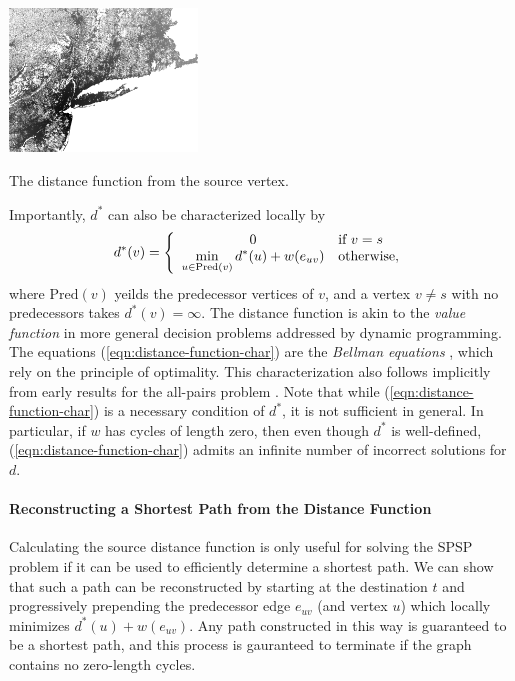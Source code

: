 \begin{marginfigure}%
   \centering%
   \includegraphics[width=5cm]{figs/incbi-road-ne/singleshot/example-dijkstraall.png}%
   \caption{The distance function from the source vertex.}%
   \label{fig:ibid:example-distance-all}%
\end{marginfigure}

Importantly, $d^*$ can also be characterized locally by
\begin{equation}
   d^*(v) = 
   \left\{ \begin{array}{cl}
      0 & \mbox{if } v = s \\
      \displaystyle\min_{u \in \mbox{\scriptsize Pred}(v)} d^*(u) + w(e_{uv}) & \mbox{otherwise,} \\
   \end{array} \right.
   \label{eqn:distance-function-char}
\end{equation}
where $\mbox{Pred}(v)$ yeilds the predecessor vertices of $v$,
and a vertex $v \neq s$ with no predecessors takes $d^*(v) = \infty$.
The distance function is akin to the \emph{value function}
in more general decision problems addressed by dynamic programming.
The equations (\ref{eqn:distance-function-char})
are the \emph{Bellman equations} \citep{bellman1958routing},
which rely on the principle of optimality.
This characterization also follows implicitly from early results for
the all-pairs problem
\citep{shimbel1955communicationnets, beckmann1955transportation}.
Note that while (\ref{eqn:distance-function-char})
is a necessary condition of $d^*$,
it is not sufficient in general.
In particular,
if $w$ has cycles of length zero,
then even though $d^*$ is well-defined,
(\ref{eqn:distance-function-char}) admits an infinite number
of incorrect solutions for $d$.

\paragraph{Reconstructing a Shortest Path from the Distance Function}
Calculating the source distance function is only useful for solving
the SPSP problem if it can be used to efficiently determine
a shortest path.
We can show that such a path can be reconstructed by starting at
the destination $t$ and progressively prepending the predecessor
edge $e_{uv}$ (and vertex $u$)
which locally minimizes $d^*(u) + w(e_{uv})$.
Any path constructed in this way is guaranteed to be a shortest path,
and this process is gauranteed to terminate if the graph
contains no zero-length cycles.

